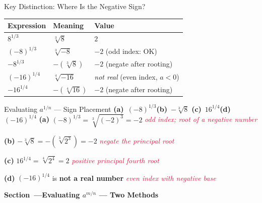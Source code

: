 \documentclass[12pt]{article}
\newcounter{mysec}
\newcommand{\mysection}[1]{%
  \stepcounter{mysec}%
  \vspace{14pt}%
  \noindent
  \begin{tcolorbox}[enhanced,colback=navy,colframe=navy,
    boxrule=0pt,arc=3pt,left=8pt,right=8pt,top=5pt,bottom=5pt,
    before skip=0pt,after skip=10pt]
    \color{white}\bfseries\large Section~\themysec\enspace---\enspace #1
  \end{tcolorbox}}
\newcommand{\step}[1]{\hfill\textcolor{crimson}{\small\textit{#1}}}
\begin{document}
\begin{conceptbox}{Key Distinction: Where Is the Negative Sign?}
\begin{center}
\renewcommand{\arraystretch}{1.5}
\begin{tabular}{@{}lll@{}}
\toprule
\textbf{Expression} & \textbf{Meaning} & \textbf{Value} \\
\midrule
$8^{1/3}$        & $\sqrt[3]{8}$          & $2$ \\
$(-8)^{1/3}$     & $\sqrt[3]{-8}$         & $-2$ \quad (odd index: OK) \\
$-8^{1/3}$       & $-(\sqrt[3]{8})$       & $-2$ \quad (negate after rooting) \\
$(-16)^{1/4}$    & $\sqrt[4]{-16}$        & \textit{not real} \quad (even index, $a<0$) \\
$-16^{1/4}$      & $-(\sqrt[4]{16})$      & $-2$ \quad (negate after rooting) \\
\bottomrule
\end{tabular}
\end{center}
\end{conceptbox}

\begin{examplebox}{Evaluating $a^{1/n}$ --- Sign Placement}
\textbf{(a)}~$(-8)^{1/3}$\quad \textbf{(b)}~$-\!\sqrt[3]{8}$\quad
\textbf{(c)}~$16^{1/4}$\quad \textbf{(d)}~$(-16)^{1/4}$
\tcblower
\textbf{(a)} $(-8)^{1/3}=\sqrt[3]{(-2)^3}=-2$ \step{odd index; root of a negative number}

\medskip
\textbf{(b)} $-\!\sqrt[3]{8}=-(\sqrt[3]{2^3})=-2$ \step{negate the principal root}

\medskip
\textbf{(c)} $16^{1/4}=\sqrt[4]{2^4}=2$ \step{positive principal fourth root}

\medskip
\textbf{(d)} $(-16)^{1/4}$ is \textbf{not a real number} \step{even index with negative base}
\end{examplebox}

\mysection{Evaluating $a^{m/n}$ --- Two Methods}
\end{document}
